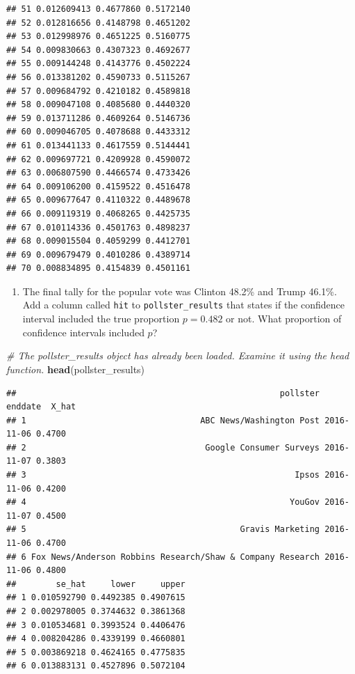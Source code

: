 \documentclass[
]{article}
\newenvironment{Shaded}{\begin{snugshade}}{\end{snugshade}}
\newcommand{\CommentTok}[1]{\textcolor[rgb]{0.56,0.35,0.01}{\textit{#1}}}
\newcommand{\KeywordTok}[1]{\textcolor[rgb]{0.13,0.29,0.53}{\textbf{#1}}}
\newcommand{\NormalTok}[1]{#1}
\providecommand{\tightlist}{%
  \setlength{\itemsep}{0pt}\setlength{\parskip}{0pt}}
\begin{document}
\begin{verbatim}
## 51 0.012609413 0.4677860 0.5172140
## 52 0.012816656 0.4148798 0.4651202
## 53 0.012998976 0.4651225 0.5160775
## 54 0.009830663 0.4307323 0.4692677
## 55 0.009144248 0.4143776 0.4502224
## 56 0.013381202 0.4590733 0.5115267
## 57 0.009684792 0.4210182 0.4589818
## 58 0.009047108 0.4085680 0.4440320
## 59 0.013711286 0.4609264 0.5146736
## 60 0.009046705 0.4078688 0.4433312
## 61 0.013441133 0.4617559 0.5144441
## 62 0.009697721 0.4209928 0.4590072
## 63 0.006807590 0.4466574 0.4733426
## 64 0.009106200 0.4159522 0.4516478
## 65 0.009677647 0.4110322 0.4489678
## 66 0.009119319 0.4068265 0.4425735
## 67 0.010114336 0.4501763 0.4898237
## 68 0.009015504 0.4059299 0.4412701
## 69 0.009679479 0.4010286 0.4389714
## 70 0.008834895 0.4154839 0.4501161
\end{verbatim}

\begin{enumerate}
\def\labelenumi{\arabic{enumi}.}
\setcounter{enumi}{2}
\tightlist
\item
  The final tally for the popular vote was Clinton 48.2\% and Trump
  46.1\%. Add a column called \texttt{hit} to \texttt{pollster\_results}
  that states if the confidence interval included the true proportion
  \(p=0.482\) or not. What proportion of confidence intervals included
  \(p\)?
\end{enumerate}

\begin{Shaded}
\begin{Highlighting}[]
\CommentTok{\# The \textasciigrave{}pollster\_results\textasciigrave{} object has already been loaded. Examine it using the \textasciigrave{}head\textasciigrave{} function.}
\KeywordTok{head}\NormalTok{(pollster\_results)}
\end{Highlighting}
\end{Shaded}

\begin{verbatim}
##                                                     pollster    enddate  X_hat
## 1                                   ABC News/Washington Post 2016-11-06 0.4700
## 2                                    Google Consumer Surveys 2016-11-07 0.3803
## 3                                                      Ipsos 2016-11-06 0.4200
## 4                                                     YouGov 2016-11-07 0.4500
## 5                                           Gravis Marketing 2016-11-06 0.4700
## 6 Fox News/Anderson Robbins Research/Shaw & Company Research 2016-11-06 0.4800
##        se_hat     lower     upper
## 1 0.010592790 0.4492385 0.4907615
## 2 0.002978005 0.3744632 0.3861368
## 3 0.010534681 0.3993524 0.4406476
## 4 0.008204286 0.4339199 0.4660801
## 5 0.003869218 0.4624165 0.4775835
## 6 0.013883131 0.4527896 0.5072104
\end{verbatim}
\end{document}
